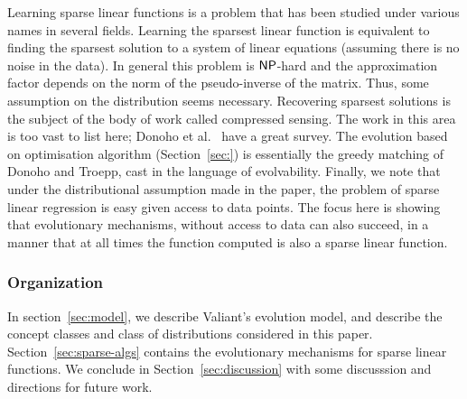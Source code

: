 
Learning sparse linear functions is a problem that has been studied under
various names in several fields. Learning the sparsest linear function is
equivalent to finding the sparsest solution to a system of linear equations
(assuming there is no noise in the data). In general this problem is $\mathsf{NP}$-hard
and the approximation factor depends on the norm of the pseudo-inverse of the
matrix\cite{Natarjan:1995}. Thus, some assumption on the distribution seems
necessary. Recovering sparsest solutions is the subject of the body of work
called compressed sensing. The work in this area is too vast to list here;
Donoho et al.~\cite{Donoho:} have a great survey. The evolution based on
optimisation algorithm (Section~\ref{sec:}) is essentially the greedy matching
of Donoho and Troepp, cast in the language of evolvability. Finally, we note
that under the distributional assumption made in the paper, the problem of
sparse linear regression is easy given access to data points. The focus here is
showing that evolutionary mechanisms, without access to data can also succeed,
in a manner that at all times the function computed is also a sparse linear
function.

\subsubsection*{Organization}

In section~\ref{sec:model}, we describe Valiant's evolution model, and describe
the concept classes and class of distributions considered in this paper.
Section~\ref{sec:sparse-algs} contains the evolutionary mechanisms for sparse
linear functions. We conclude in Section~\ref{sec:discussion} with some
discusssion and directions for future work.
